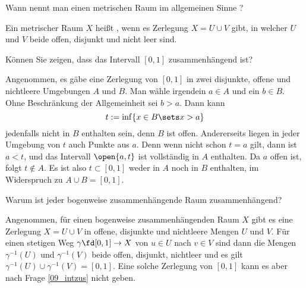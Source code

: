\begin{frage}
  Wann nennt man einen metrischen Raum im allgemeinen 
  Sinne ?
\end{frage}   


\begin{antwort}
  Ein metrischer Raum $X$ heißt , wenn es 
   Zerlegung 
  $X=U \cup V$ gibt, in welcher $U$ und $V$ beide offen, disjunkt und 
  nicht leer sind.
  \AntEnd
\end{antwort}



\begin{frage}\label{09_intzus}
  Können Sie zeigen, dass das Intervall $[0,1]$ zusammenhängend ist?
\end{frage}

\begin{antwort}
  Angenommen, es gäbe eine Zerlegung von $[0,1]$ in zwei disjunkte, 
  offene und nichtleere Umgebungen $A$ und $B$. Man wähle irgendein 
  $a\in A$ und ein $b\in B$. Ohne Beschränkung der Allgemeinheit sei 
  $b>a$. Dann kann 
  \[
  t := \inf\{ x\in B \sets x>a \}  
  \]
  jedenfalls nicht in $B$ enthalten sein, denn $B$ ist offen. 
  Andererseits liegen in jeder Umgebung von $t$ auch Punkte aus $a$. 
  Denn wenn nicht schon $t=a$ gilt, dann ist $a<t$, und das Intervall 
  $\open{a,t}$ ist vollständig in $A$ enthalten. Da $a$ offen ist, folgt 
  $t\not\in A$. Es ist also $t \subset [0,1]$ 
  weder in $A$ noch in $B$ enthalten, im Widerspruch zu $A\cup B=[0,1]$. 
  \AntEnd  
\end{antwort}

\begin{frage}
  Warum ist jeder bogenweise zusammenhängende Raum zusammenhängend?
\end{frage}

\begin{antwort}
  Angenommen, für einen bogenweise zusammenhängenden Raum $X$ gibt es eine 
  Zerlegung $X=U\cup V$ in offene, disjunkte und nichtleere Mengen 
  $U$ und $V$. Für einen stetigen Weg $\gamma\fd [0,1]\to X$ von 
  $u \in U$ nach $v\in V$ sind dann die Mengen 
  $\gamma^{-1}(U)$ und $\gamma^{-1}(V)$ beide offen, disjunkt, nichtleer 
  und es gilt $\gamma^{-1}(U) \cup \gamma^{-1}(V)=[0,1]$. Eine solche 
  Zerlegung von $[0,1]$ kann es aber nach Frage \ref{09_intzus} 
  nicht geben.  
  \AntEnd 
\end{antwort}

